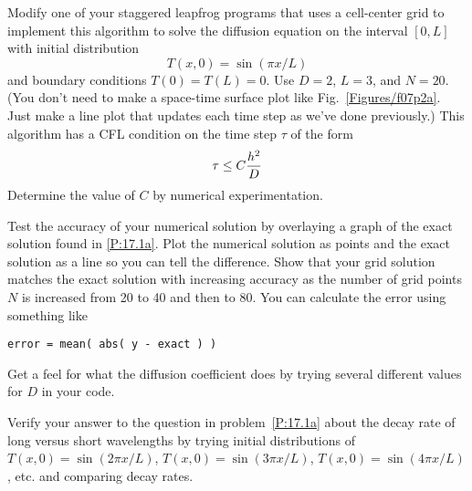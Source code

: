 \begin{enumerate}
\probtwo \label{P:17.2}
\begin{enumerate}

\subprob \label{P:17.2a}

    Modify one of your staggered leapfrog programs that uses
    a cell-center grid to implement this algorithm to solve
    the diffusion equation on the interval $[0,L]$ with
    initial distribution
    \begin{equation}
        T(x,0)=\sin{(\pi x/L)}
    \end{equation}
    and boundary conditions $T(0)=T(L)=0$. Use $D=2$, $L=3$,
    and $N=20$. (You don't need to make a space-time surface
    plot like Fig.~\ref{Figures/f07p2a}.  Just make a line plot
    that updates each time step as we've done previously.)
      This algorithm has a
    CFL condition on the time step $\tau$ of the form
    \begin{equation}
        \tau \le C {h^2 \over D}
    \end{equation}
    Determine the value of $C$ by numerical experimentation.

    Test the accuracy of your numerical solution by
    overlaying a graph of the exact solution found in
    \ref{P:17.1a}. Plot the numerical solution as points and
    the exact solution as a line so you can tell the
    difference.  Show that your grid solution matches the
    exact solution with increasing accuracy as the number of
    grid points $N$ is increased from 20 to 40 and then to
    80.  You can calculate the error using something like
\begin{Verbatim}
error = mean( abs( y - exact ) )
\end{Verbatim}

\subprob Get a feel for what the diffusion coefficient does
    by trying several different values for $D$ in your code.
    

\subprob Verify your answer to the question in
    problem~\ref{P:17.1a} about the decay rate of long versus
    short wavelengths by trying initial distributions of
    $T(x,0) = \sin(2\pi x/L)$, $T(x,0) = \sin(3\pi x/L)$,
    $T(x,0) = \sin(4\pi x/L)$, etc. and comparing decay
    rates.


\end{enumerate}
\end{enumerate}
